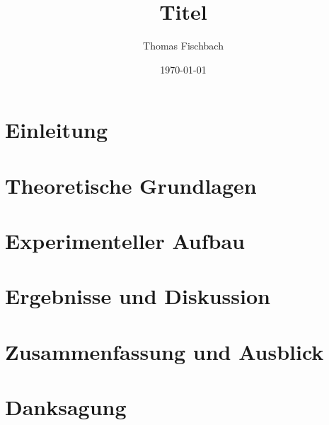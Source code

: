 



\title{\vspace{30mm} \bf{Titel}}
\author{Thomas Fischbach}
\date{\today}
\maketitle

\vfill
  
  
  
  
\tableofcontents
  
\newpage
  
\section{Einleitung}

\section{Theoretische Grundlagen}

\section{Experimenteller Aufbau}

\section{Ergebnisse und Diskussion}

\section{Zusammenfassung und Ausblick}

%
%
\section{Danksagung}




